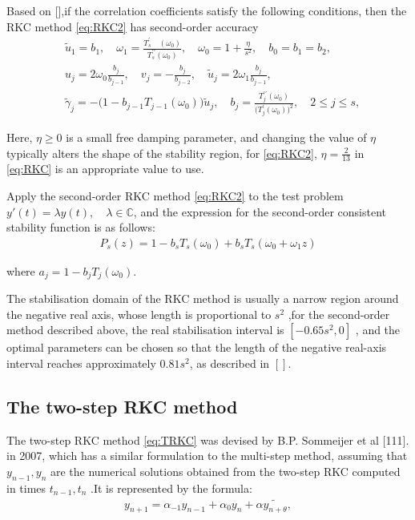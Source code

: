 \documentclass[review,fleqn]{elsarticle}
\begin{document}
Based on [],if the correlation coefficients satisfy the following conditions, 
then the RKC method \eqref{eq:RKC2} has second-order accuracy
\begin{equation}
 \begin{aligned}
    &\tilde{u}_{1} =b_{1} ,\quad \omega_{1}=\frac{T_{s}^{\prime}\quad(\omega_{0})}{T_{s}^{\prime\prime}(\omega_{0})}, \quad  \omega_{0}=1+\frac{\eta}{s^{2}}, \quad b_{0}=b_{1}=b_{2}, \\
    &u_{j} =2\omega_{0}\frac{b_{j}}{b_{j-1}},\quad v_{j}=-\frac{b_{j}}{b_{j-2}},\quad\tilde{u}_{j}=2\omega_{1}\frac{b_{j}}{b_{j-1}},  \\
    &\tilde{\gamma}_{j} =-\big(1-b_{j-1}T_{j-1}(\omega_{0})\big)\tilde{u}_{j},\quad b_{j}=\frac{T_{j}^{\prime\prime}(\omega_{0})}{\big(T_{j}^{\prime}(\omega_{0})\big)^{2}},\quad2\leq j\leq s, 
 \end{aligned}
 \label{eq:RKC_coefficient}
\end{equation}

Here, $\eta \geq 0$ is a small free damping parameter, and changing the value of $\eta$ typically alters the shape of the stability region,
for \eqref{eq:RKC2}, $\eta = \frac{2}{13}$ in \eqref{eq:RKC} is an appropriate value to use.

Apply the second-order RKC method \eqref{eq:RKC2} to the test problem $y'(t)=\lambda y(t),\quad \lambda \in \mathbb{C}$, and the expression for the second-order consistent stability function is as follows:
\begin{align}
    P_s(z)=1-b_sT_s(\omega_0)+b_sT_s(\omega_0+\omega_1z)
\end{align}

where $a_{j}=1-b_{j}T_{j}(\omega_{0}).$

The stabilisation domain of the RKC method is usually a narrow region around the negative real axis, whose length is proportional to $s^2$
,for the second-order method described above, the real stabilisation interval is $[-0.65s^2,0]$ , and the optimal parameters can be chosen so that the length of the negative real-axis interval reaches approximately $0.81s^2$, as described in $[]$.

\subsection{The two-step RKC method}

The two-step RKC method  \eqref{eq:TRKC} was devised by B.P. Sommeijer et al [111]. in 2007, which has a similar formulation to the multi-step method, assuming that $y_{n-1},y_{n}$ are the numerical solutions obtained from the two-step RKC computed in times $t_{n-1},t_{n}$
.It is represented by the formula:
\begin{align}
    y_{n+1}=\alpha_{-1}y_{n-1}+\alpha_{0}y_{n}+\alpha\tilde{y_{n+\theta}},
\label{eq:TRKC}
\end{align}
\end{document}
